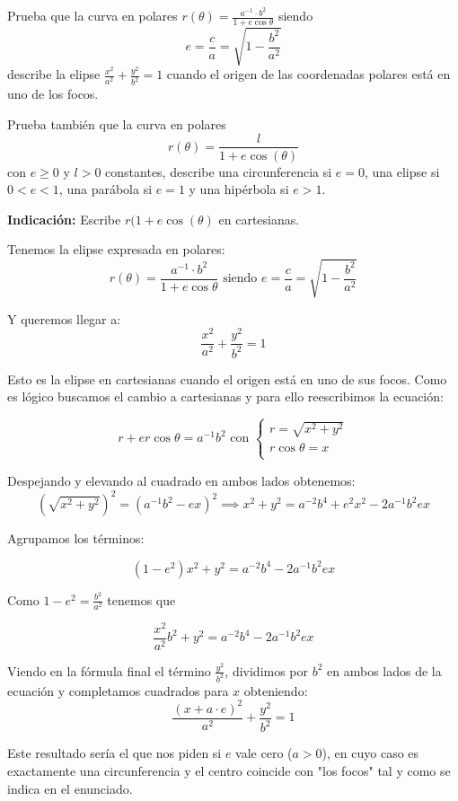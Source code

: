\begin{problem}[3]
Prueba que la curva en polares $r(\theta)= \frac{a^{-1} \cdot b^2}{1 + e\cos\theta}$ siendo
\[ e = \frac{c}{a} = \sqrt{1 - \frac{b^2}{a^2}}\]
describe la elipse $\frac{x^2}{a^2} + \frac{y^2}{b^2} = 1$ cuando el origen de las coordenadas polares está en uno de los focos.

Prueba también que la curva en polares
\[r(\theta)=\frac{l}{1+e\cos(\theta)}\]
con $e \geq 0$ y $l>0$ constantes, describe una circunferencia si $e=0$, una elipse si $0<e<1$, una parábola si $e=1$ y una hipérbola si $e>1$.

\textbf{Indicación:} Escribe $r(1+e\cos(\theta)$ en cartesianas.

\solution

    Tenemos la elipse expresada en polares:$$r(\theta)= \frac{a^{-1} \cdot b^2}{1 + e\cos\theta} \text{  siendo  } e = \frac{c}{a} = \sqrt{1 - \frac{b^2}{a^2}}$$

    Y queremos llegar a: $$\frac{x^2}{a^2} + \frac{y^2}{b^2} = 1$$

    Esto es la elipse en cartesianas cuando el origen está en uno de sus focos. Como es lógico buscamos el cambio a cartesianas y para ello reescribimos la ecuación:

    $$ r + er\cos\theta = a^{-1} b^2 \text{ con }
    \begin{cases}
    r = \sqrt{x^2 + y^2}\\
    r\cos\theta = x\\
    \end{cases}$$

    Despejando y elevando al cuadrado en ambos lados obtenemos:
    \[(\sqrt{x^2 + y^2})^2 = (a^{-1}b^2 - ex)^2 \implies x^2 + y^2 = a^{-2} b^4 + e^2x^2 - 2a^{-1}b^2ex\]

    Agrupamos los términos:

    \[(1-e^2)x^2 + y^2 = a^{-2} b^4 - 2a^{-1}b^2ex\]


    Como $1-e^2 = \frac{b^2}{a^2}$ tenemos que

    $$\frac{x^2}{a^2}b^2 + y^2 = a^{-2} b^4 - 2a^{-1}b^2ex$$

    Viendo en la fórmula final el término $\frac{y^2}{b^2}$, dividimos por $b^2$ en ambos lados de la ecuación y completamos cuadrados para $x$ obteniendo:
    $$\frac{(x + a\cdot e)^2}{a^2} + \frac{y^2}{b^2} = 1$$

    Este resultado sería el que nos piden si $e$ vale cero ($a>0$), en cuyo caso es exactamente una circunferencia y el centro coincide con "los focos" tal y como se indica en el enunciado.
\end{problem}


